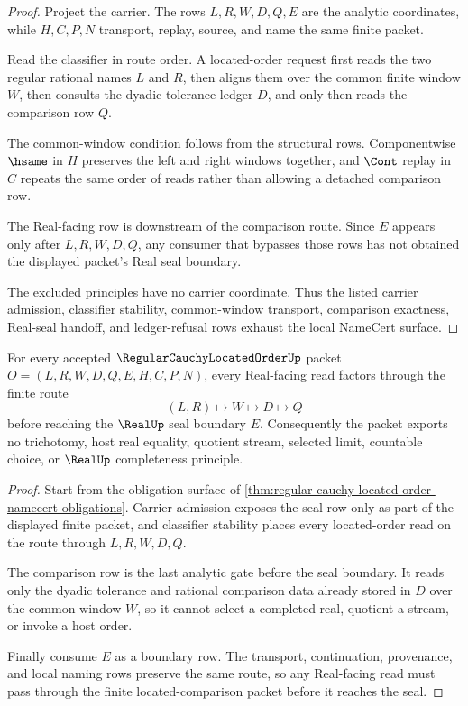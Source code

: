 \begin{proof}
Project the carrier. The rows $L,R,W,D,Q,E$ are the analytic coordinates, while $H,C,P,N$ transport, replay, source, and name the same finite packet.

Read the classifier in route order. A located-order request first reads the two regular rational names $L$ and $R$, then aligns them over the common finite window $W$, then consults the dyadic tolerance ledger $D$, and only then reads the comparison row $Q$.

The common-window condition follows from the structural rows. Componentwise $\hsame$ in $H$ preserves the left and right windows together, and $\Cont$ replay in $C$ repeats the same order of reads rather than allowing a detached comparison row.

The Real-facing row is downstream of the comparison route. Since $E$ appears only after $L,R,W,D,Q$, any consumer that bypasses those rows has not obtained the displayed packet's Real seal boundary.

The excluded principles have no carrier coordinate. Thus the listed carrier admission, classifier stability, common-window transport, comparison exactness, Real-seal handoff, and ledger-refusal rows exhaust the local NameCert surface.
\end{proof}

\begin{theorem}
\label{thm:regular-cauchy-located-order-real-seal-boundary}
For every accepted $\RegularCauchyLocatedOrderUp$ packet $O=(L,R,W,D,Q,E,H,C,P,N)$, every Real-facing read factors through the finite route
$$
(L,R)\longmapsto W\longmapsto D\longmapsto Q
$$
before reaching the $\RealUp$ seal boundary $E$. Consequently the packet exports no trichotomy, host real equality, quotient stream, selected limit, countable choice, or $\RealUp$ completeness principle.
\end{theorem}
\begin{proof}
Start from the obligation surface of \autoref{thm:regular-cauchy-located-order-namecert-obligations}. Carrier admission exposes the seal row only as part of the displayed finite packet, and classifier stability places every located-order read on the route through $L,R,W,D,Q$.

The comparison row is the last analytic gate before the seal boundary. It reads only the dyadic tolerance and rational comparison data already stored in $D$ over the common window $W$, so it cannot select a completed real, quotient a stream, or invoke a host order.

Finally consume $E$ as a boundary row. The transport, continuation, provenance, and local naming rows preserve the same route, so any Real-facing read must pass through the finite located-comparison packet before it reaches the seal.
\end{proof}

